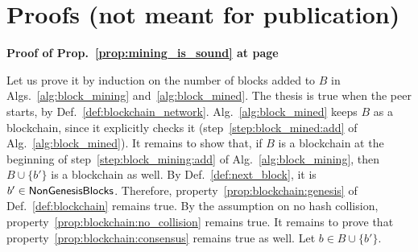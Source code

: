 \newpage

\appendix
\section{Proofs (not meant for publication)}

\noindent
\textbf{Proof of Prop.~\ref{prop:mining_is_sound} at page~\pageref{prop:mining_is_sound}}

\noindent
  Let us prove it by induction on the number of blocks added to $B$ in Algs.~\ref{alg:block_mining}
  and~\ref{alg:block_mined}. The thesis is true when the peer starts,
  by Def.~\ref{def:blockchain_network}. Alg.~\ref{alg:block_mined} keeps $B$
  as a blockchain, since it explicitly checks it (step~\ref{step:block_mined:add} of
  Alg.~\ref{alg:block_mined}). It remains to show that, if $B$ is a blockchain at the beginning
  of step~\ref{step:block_mining:add} of Alg.~\ref{alg:block_mining}, then $B\cup\{b'\}$ is a
  blockchain as well. By Def.~\ref{def:next_block}, it is $b'\in{\mathsf{NonGenesisBlocks}}$.
  Therefore, property~\ref{prop:blockchain:genesis} of Def.~\ref{def:blockchain} remains true.
  By the assumption on no hash collision, property~\ref{prop:blockchain:no_collision} remains true.
  It remains to prove that property~\ref{prop:blockchain:consensus} remains true as well.
  Let $b\in B\cup\{b'\}$.
